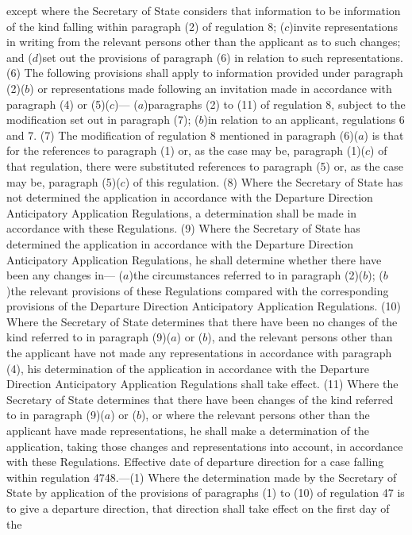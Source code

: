 \documentclass[a4paper]{article}
\begin{document}
except where the Secretary of State considers that information to be information
of the kind falling within paragraph (2) of regulation 8;
($c$)invite representations in writing from the relevant persons other than the
applicant as to such changes; and
($d$)set out the provisions of paragraph (6) in relation to such representations.
(6) The following provisions shall apply to information provided under paragraph
(2)($b$) or representations made following an invitation made in accordance with
paragraph (4) or (5)($c$)—
($a$)paragraphs (2) to (11) of regulation 8, subject to the modification set out
in paragraph (7);
($b$)in relation to an applicant, regulations 6 and 7.
(7) The modification of regulation 8 mentioned in paragraph (6)($a$) is that for
the references to paragraph (1) or, as the case may be, paragraph (1)($c$) of that
regulation, there were substituted references to paragraph (5) or, as the case
may be, paragraph (5)($c$) of this regulation.
(8) Where the Secretary of State has not determined the application in
accordance with the Departure Direction Anticipatory Application Regulations, a
determination shall be made in accordance with these Regulations.
(9) Where the Secretary of State has determined the application in accordance
with the Departure Direction Anticipatory Application Regulations, he shall
determine whether there have been any changes in—
($a$)the circumstances referred to in paragraph (2)($b$);
($b$)the relevant provisions of these Regulations compared with the corresponding
provisions of the Departure Direction Anticipatory Application Regulations.
(10) Where the Secretary of State determines that there have been no changes of
the kind referred to in paragraph (9)($a$) or ($b$), and the relevant persons other
than the applicant have not made any representations in accordance with
paragraph (4), his determination of the application in accordance with the
Departure Direction Anticipatory Application Regulations shall take effect.
(11) Where the Secretary of State determines that there have been changes of the
kind referred to in paragraph (9)($a$) or ($b$), or where the relevant persons other
than the applicant have made representations, he shall make a determination of
the application, taking those changes and representations into account, in
accordance with these Regulations.
Effective date of departure direction for a case falling within regulation
4748.—(1) Where the determination made by the Secretary of State by application
of the provisions of paragraphs (1) to (10) of regulation 47 is to give a
departure direction, that direction shall take effect on the first day of the
\end{document}
